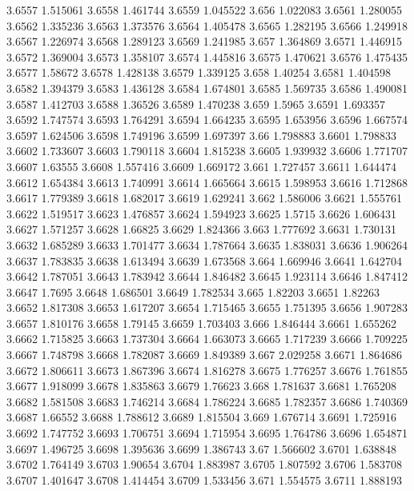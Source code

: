 3.6557  1.515061
3.6558  1.461744
3.6559  1.045522
3.656  1.022083
3.6561  1.280055
3.6562  1.335236
3.6563  1.373576
3.6564  1.405478
3.6565  1.282195
3.6566  1.249918
3.6567  1.226974
3.6568  1.289123
3.6569  1.241985
3.657  1.364869
3.6571  1.446915
3.6572  1.369004
3.6573  1.358107
3.6574  1.445816
3.6575  1.470621
3.6576  1.475435
3.6577  1.58672
3.6578  1.428138
3.6579  1.339125
3.658  1.40254
3.6581  1.404598
3.6582  1.394379
3.6583  1.436128
3.6584  1.674801
3.6585  1.569735
3.6586  1.490081
3.6587  1.412703
3.6588  1.36526
3.6589  1.470238
3.659  1.5965
3.6591  1.693357
3.6592  1.747574
3.6593  1.764291
3.6594  1.664235
3.6595  1.653956
3.6596  1.667574
3.6597  1.624506
3.6598  1.749196
3.6599  1.697397
3.66  1.798883
3.6601  1.798833
3.6602  1.733607
3.6603  1.790118
3.6604  1.815238
3.6605  1.939932
3.6606  1.771707
3.6607  1.63555
3.6608  1.557416
3.6609  1.669172
3.661  1.727457
3.6611  1.644474
3.6612  1.654384
3.6613  1.740991
3.6614  1.665664
3.6615  1.598953
3.6616  1.712868
3.6617  1.779389
3.6618  1.682017
3.6619  1.629241
3.662  1.586006
3.6621  1.555761
3.6622  1.519517
3.6623  1.476857
3.6624  1.594923
3.6625  1.5715
3.6626  1.606431
3.6627  1.571257
3.6628  1.66825
3.6629  1.824366
3.663  1.777692
3.6631  1.730131
3.6632  1.685289
3.6633  1.701477
3.6634  1.787664
3.6635  1.838031
3.6636  1.906264
3.6637  1.783835
3.6638  1.613494
3.6639  1.673568
3.664  1.669946
3.6641  1.642704
3.6642  1.787051
3.6643  1.783942
3.6644  1.846482
3.6645  1.923114
3.6646  1.847412
3.6647  1.7695
3.6648  1.686501
3.6649  1.782534
3.665  1.82203
3.6651  1.82263
3.6652  1.817308
3.6653  1.617207
3.6654  1.715465
3.6655  1.751395
3.6656  1.907283
3.6657  1.810176
3.6658  1.79145
3.6659  1.703403
3.666  1.846444
3.6661  1.655262
3.6662  1.715825
3.6663  1.737304
3.6664  1.663073
3.6665  1.717239
3.6666  1.709225
3.6667  1.748798
3.6668  1.782087
3.6669  1.849389
3.667  2.029258
3.6671  1.864686
3.6672  1.806611
3.6673  1.867396
3.6674  1.816278
3.6675  1.776257
3.6676  1.761855
3.6677  1.918099
3.6678  1.835863
3.6679  1.76623
3.668  1.781637
3.6681  1.765208
3.6682  1.581508
3.6683  1.746214
3.6684  1.786224
3.6685  1.782357
3.6686  1.740369
3.6687  1.66552
3.6688  1.788612
3.6689  1.815504
3.669  1.676714
3.6691  1.725916
3.6692  1.747752
3.6693  1.706751
3.6694  1.715954
3.6695  1.764786
3.6696  1.654871
3.6697  1.496725
3.6698  1.395636
3.6699  1.386743
3.67  1.566602
3.6701  1.638848
3.6702  1.764149
3.6703  1.90654
3.6704  1.883987
3.6705  1.807592
3.6706  1.583708
3.6707  1.401647
3.6708  1.414454
3.6709  1.533456
3.671  1.554575
3.6711  1.888193
